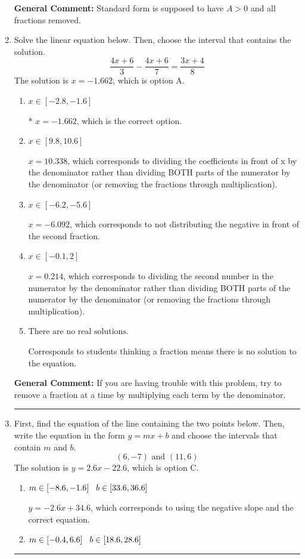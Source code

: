 \documentclass{extbook}[14pt]
\newcommand{\litem}[1]{\item #1

\rule{\textwidth}{0.4pt}}
\begin{document}
\begin{enumerate}
{\textbf{General Comment:} Standard form is supposed to have $A > 0$ and all fractions removed.
}
\litem{
Solve the linear equation below. Then, choose the interval that contains the solution.
\[ \frac{4x + 6}{3} - \frac{4x + 6}{7} = \frac{3x + 4}{8} \]The solution is \( x = -1.662 \), which is option A.\begin{enumerate}[label=\Alph*.]
\item \( x \in [-2.8, -1.6] \)

* $x = -1.662$, which is the correct option.
\item \( x \in [9.8, 10.6] \)

 $x = 10.338$, which corresponds to dividing the coefficients in front of x by the denominator rather than dividing BOTH parts of the numerator by the denominator (or removing the fractions through multiplication).
\item \( x \in [-6.2, -5.6] \)

 $x = -6.092$, which corresponds to not distributing the negative in front of the second fraction.
\item \( x \in [-0.1, 2] \)

 $x = 0.214$, which corresponds to dividing the second number in the numerator by the denominator rather than dividing BOTH parts of the numerator by the denominator (or removing the fractions through multiplication).
\item \( \text{There are no real solutions.} \)

Corresponds to students thinking a fraction means there is no solution to the equation.
\end{enumerate}

\textbf{General Comment:} If you are having trouble with this problem, try to remove a fraction at a time by multiplying each term by the denominator.
}
\litem{
First, find the equation of the line containing the two points below. Then, write the equation in the form $ y=mx+b $ and choose the intervals that contain $m$ and $b$.
\[ (6, -7) \text{ and } (11, 6) \]The solution is \( y = 2.6x -22.6 \), which is option C.\begin{enumerate}[label=\Alph*.]
\item \( m \in [-8.6, -1.6] \hspace*{3mm} b \in [33.6, 36.6] \)

 $y = -2.6x + 34.6$, which corresponds to using the negative slope and the correct equation.
\item \( m \in [-0.4, 6.6] \hspace*{3mm} b \in [18.6, 28.6] \)


\end{enumerate}}
\end{enumerate}
\end{document}
